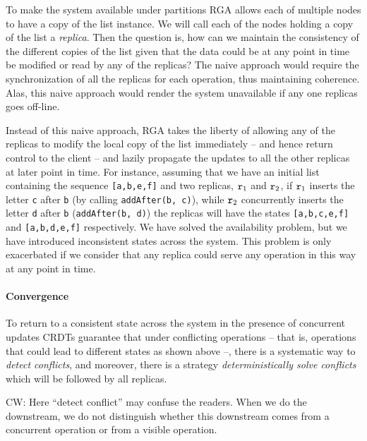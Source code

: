 To make the system available under partitions RGA allows each of
multiple nodes to have a copy of the list instance.
%
We will call each of the nodes holding a copy of the list a \emph{replica}.
%
Then the question is, how can we maintain the consistency of the
different copies of the list given that the data could be at any point
in time be modified or read by any of the replicas?
%
The naive approach would require the synchronization of all the
replicas for each operation, thus maintaining coherence.
%
Alas, this naive approach would render the system unavailable if any
one replicas goes off-line.
%

Instead of this naive approach, RGA takes the liberty of allowing any
of the replicas to modify the local copy of the list immediately --
and hence return control to the client -- and lazily propagate the
updates to all the other replicas at later point in time.
%
For instance, assuming that we have an initial list containing the
sequence \lstinline|[a,b,e,f]| and two replicas, $\mathtt{r}_1$ and
$\mathtt{r}_2$, if $\mathtt{r}_1$ inserts the letter \lstinline|c| after
\lstinline|b| (by calling \lstinline|addAfter(b, c)|), while $\mathtt{r}_2$
concurrently inserts the letter \lstinline|d| after \lstinline|b|
(\lstinline|addAfter(b, d)|) the replicas will have the states
\lstinline|[a,b,c,e,f]| and \lstinline|[a,b,d,e,f]|
respectively.
%
We have solved the availability problem, but we have introduced
inconsistent states across the system.
%
This problem is only exacerbated if we consider that any replica could
serve any operation in this way at any point in time.

\paragraph{Convergence}

To return to a consistent state across the system in the presence of
concurrent updates CRDTs guarantee that under conflicting operations --
that is, operations that could lead to different states as shown above
--, there is a systematic way to \emph{detect conflicts}, and moreover, there
is a strategy \emph{deterministically solve conflicts} which will be followed
by all replicas. 

{\color {red}CW: Here ``detect conflict'' may confuse the readers. When we do the downstream, we do not distinguish whether this downstream comes from a concurrent operation or from a visible operation.}


